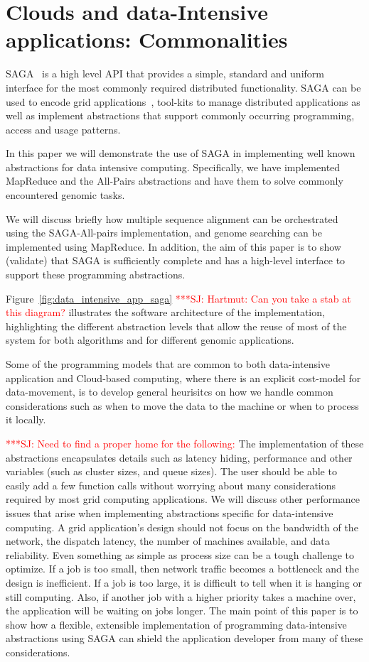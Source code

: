 \documentclass[conference,final]{IEEEtran}
\newcommand{\jhanote}[1]{ {\textcolor{red} { ***SJ: #1 }}}
\newcommand{\jhanote}[1]{}
\begin{document}
\section{Clouds and data-Intensive applications: Commonalities}

SAGA~\cite{saga_gfd90} is a high level API that provides a simple,
standard and uniform interface for the most commonly required
distributed functionality.  SAGA can be used to encode grid
applications~\cite{saga_escience07, saga_tg08}, tool-kits to manage
distributed applications as well as implement abstractions that
support commonly occurring programming, access and usage patterns.

In this paper we will demonstrate the use of SAGA in implementing well
known abstractions for data intensive computing.  Specifically, we
have implemented MapReduce and the All-Pairs abstractions and have
them to solve commonly encountered genomic tasks.

We will discuss briefly how multiple sequence alignment can be
orchestrated using the SAGA-All-pairs implementation, and genome
searching can be implemented using MapReduce.  In addition, the aim of
this paper is to show (validate) that SAGA is sufficiently complete
and has a high-level interface to support these programming
abstractions.

Figure~\ref{fig:data_intensive_app_saga} \jhanote{Hartmut: Can you
  take a stab at this diagram?}  illustrates the software architecture
of the implementation, highlighting the different abstraction levels
that allow the reuse of most of the system for both algorithms and for
different genomic applications.

Some of the programming models that are common to both data-intensive
application and Cloud-based computing, where there is an explicit
cost-model for data-movement, is to develop general heurisitcs on how
we handle common considerations such as when to move the data to the
machine or when to process it locally.

\jhanote{Need to find a proper home for the following:} The
implementation of these abstractions encapsulates details such as
latency hiding, performance and other variables (such as cluster
sizes, and queue sizes).  The user should be able to easily add a few
function calls without worrying about many considerations required by
most grid computing applications.  We will discuss other performance
issues that arise when implementing abstractions specific for
data-intensive computing.  A grid application's design should not
focus on the bandwidth of the network, the dispatch latency, the
number of machines available, and data reliability.  Even something as
simple as process size can be a tough challenge to optimize.  If a job
is too small, then network traffic becomes a bottleneck and the design
is inefficient.  If a job is too large, it is difficult to tell when
it is hanging or still computing.  Also, if another job with a higher
priority takes a machine over, the application will be waiting on jobs
longer.  The main point of this paper is to show how a flexible,
extensible implementation of programming data-intensive abstractions
using SAGA can shield the application developer from many of these
considerations.
\end{document}
